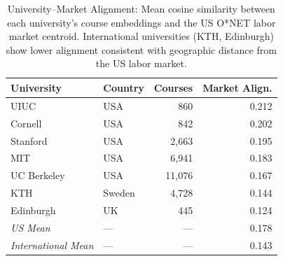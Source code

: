 \begin{table}[t]
\centering
\caption{University--Market Alignment: Mean cosine similarity between each university's course embeddings and the US O*NET labor market centroid. International universities (KTH, Edinburgh) show lower alignment consistent with geographic distance from the US labor market.}
\label{tab:market-alignment}
\begin{tabular}{llrr}
\toprule
\textbf{University} & \textbf{Country} & \textbf{Courses} & \textbf{Market Align.} \\
\midrule
UIUC & USA & 860 & 0.212 \\
Cornell & USA & 842 & 0.202 \\
Stanford & USA & 2,663 & 0.195 \\
MIT & USA & 6,941 & 0.183 \\
UC Berkeley & USA & 11,076 & 0.167 \\
KTH & Sweden & 4,728 & 0.144 \\
Edinburgh & UK & 445 & 0.124 \\
\midrule
\textit{US Mean} & --- & --- & 0.178 \\
\textit{International Mean} & --- & --- & 0.143 \\
\bottomrule
\end{tabular}
\end{table}
